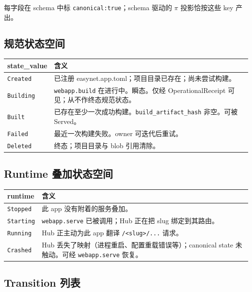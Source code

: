 \documentclass[11pt,a4paper]{article}
\theoremstyle{definition}
\begin{document}
每字段在 schema 中标 \texttt{canonical:true}；schema 驱动的
$\pi$ 投影恰按这些 key 产出。

\subsection{规范状态空间}

\begin{center}
\renewcommand{\arraystretch}{1.25}
\begin{tabularx}{\linewidth}{l X}
\toprule
\textbf{state\_value} & \textbf{含义} \\
\midrule
\texttt{Created}   & 已注册 easynet.app.toml；项目目录已存在；尚未尝试构建。 \\
\texttt{Building}  & \texttt{webapp.build} 在进行中。瞬态。仅经 OperationalReceipt 可见；从不作终态规范状态。 \\
\texttt{Built}     & 已存在至少一次成功构建。\texttt{build\_artifact\_hash} 非空。可被 Served。 \\
\texttt{Failed}    & 最近一次构建失败。owner 可迭代后重试。 \\
\texttt{Deleted}   & 终态；项目目录与 blob 引用清除。 \\
\bottomrule
\end{tabularx}
\end{center}

\subsection{Runtime 叠加状态空间}

\begin{center}
\renewcommand{\arraystretch}{1.25}
\begin{tabularx}{\linewidth}{l X}
\toprule
\textbf{runtime} & \textbf{含义} \\
\midrule
\texttt{Stopped}  & 此 app 没有附着的服务叠加。 \\
\texttt{Starting} & \texttt{webapp.serve} 已被调用；Hub 正在把 slug 绑定到其路由。 \\
\texttt{Running}  & Hub 正主动为此 app 翻译 \texttt{/<slug>/...} 请求。 \\
\texttt{Crashed}  & Hub 丢失了映射（进程重启、配置重载错误等）；canonical state 未触动。可经 \texttt{webapp.serve} 恢复。 \\
\bottomrule
\end{tabularx}
\end{center}

\subsection{Transition 列表}
\end{document}
